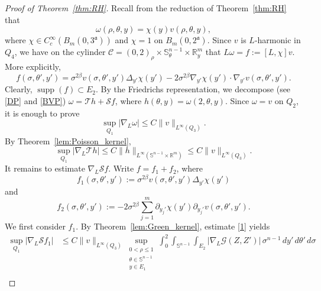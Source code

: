 \documentclass[12pt]{amsart}
\begin{document}
\begin{proof}[Proof of Theorem~\ref{thm:RH}]
Recall from the reduction of Theorem~\ref{thm:RH} that
\begin{equation*}
    \omega(\rho,\theta,y)=\chi(y)v(\rho,\theta,y),
\end{equation*}
where $\chi\in C_c^\infty(B_m(0,3^{\mathfrak a}))$ and $\chi=1$ on $B_m(0,2^{\mathfrak a})$. Since $v$ is $L$-harmonic in $Q_4$, we have on the cylinder $\mathcal{C} = (0,2)_\rho \times \mathbb S^{n-1}_\theta \times \mathbb R^m_y$ that $L\omega=f:=[L,\chi]v$. More explicitly,
\begin{equation*}
    f(\sigma,\theta',y')
    =
    \sigma^{2\beta}v(\sigma,\theta',y')\Delta_{y'}\chi(y')
    -
    2\sigma^{2\beta}\nabla_{y'}\chi(y')\cdot
    \nabla_{y'}v(\sigma,\theta',y').
\end{equation*}
Clearly, $\operatorname{supp}(f) \subset E_2$. By the Friedrichs representation, we decompose (see \eqref{DP} and \eqref{BVP}) $\omega=\mathcal T h+\mathcal S f$, where $h(\theta,y)=\omega(2,\theta,y)$. Since $\omega=v$ on $Q_2$, it is enough to prove
\begin{equation*}
    \sup_{Q_1}|\nabla_L\omega|
    \le
    C\|v\|_{L^\infty(Q_3)}.
\end{equation*}
By Theorem~\ref{lem:Poisson_kernel},
\begin{equation*}
    \sup_{Q_1}|\nabla_L\mathcal T h|
    \leq
    C\|h\|_{L^\infty(\mathbb S^{n-1}\times\mathbb R^m)}
    \leq
    C\|v\|_{L^\infty(Q_3)}.
\end{equation*}
It remains to estimate $\nabla_L\mathcal S f$. Write $f=f_1+f_2$, where
\begin{equation*}
    f_1(\sigma,\theta',y')
    :=
    \sigma^{2\beta}v(\sigma,\theta',y')\Delta_{y'}\chi(y')
\end{equation*}
and
\begin{equation*}
    f_2(\sigma,\theta',y')
    :=
    -
    2\sigma^{2\beta}
    \sum_{j=1}^m
        \partial_{y_j'}\chi(y')
        \partial_{y_j'}v(\sigma,\theta',y').
\end{equation*}
We first consider $f_1$. By Theorem~\ref{lem:Green_kernel}, estimate
\eqref{1} yields
\begin{align*}
    \sup_{Q_1}
    |\nabla_L\mathcal S f_1|
    &\le C\|v\|_{L^\infty(Q_3)}
    \sup_{\substack{0<\rho\le 1\\ \theta\in\mathbb S^{n-1}\\ y\in E_1}}
    \int_0^2
    \int_{\mathbb S^{n-1}}
    \int_{E_2} |\nabla_L \mathcal{G}(Z,Z')| \, \sigma^{n-1} \, dy' \, d\theta' \, d\sigma \\

\end{align*}
\end{proof}
\end{document}

